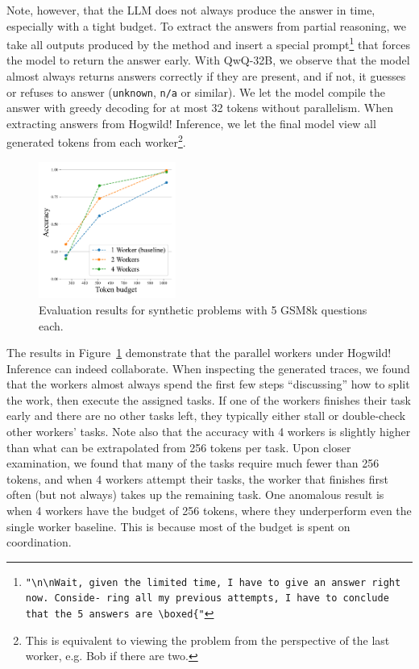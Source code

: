 Note, however, that the LLM does not always produce the answer in time, especially with a tight budget. To extract the answers from partial reasoning, we take all outputs produced by the method and insert a special prompt\footnote[9]{\texttt{"\textbackslash n\textbackslash nWait, given the limited time, I have to give an answer right now. Conside- ring all my previous attempts, I have to conclude that the 5 answers are \textbackslash boxed\{"}} that forces the model to return the answer early. With QwQ-32B, we observe that the model almost always returns answers correctly if they are present, and if not, it guesses or refuses to answer (\texttt{unknown}, \texttt{n/a} or similar). We let the model compile the answer with greedy decoding for at most 32 tokens without parallelism. When extracting answers from Hogwild! Inference, we let the final model view all generated tokens from each worker\footnote[10]{This is equivalent to viewing the problem from the perspective of the last worker, e.g. Bob if there are two.}.

\begin{figure}
  \vspace{-20px}
  \begin{center}
    \includegraphics[width=0.4\textwidth]{resources/method_comparison_gsm8k.pdf}
  \end{center}
  \vspace{-10px}
  \caption{Evaluation results for synthetic problems with 5 GSM8k questions each.}\vspace{-10px}
  \label{fig:results_gsm8k}

\end{figure}


The results in Figure~\ref{fig:results_gsm8k} demonstrate that the parallel workers under Hogwild! Inference can indeed collaborate. When inspecting the generated traces, we found that the workers almost always spend the first few steps ``discussing'' how to split the work, then execute the assigned tasks. If one of the workers finishes their task early and there are no other tasks left, they typically either stall or double-check other workers' tasks. Note also that the accuracy with 4 workers is slightly higher than what can be extrapolated from 256 tokens per task. Upon closer examination, we found that many of the tasks require much fewer than 256 tokens, and when 4 workers attempt their tasks, the worker that finishes first often (but not always) takes up the remaining task. One anomalous result is when 4 workers have the budget of 256 tokens, where they underperform even the single worker baseline. This is because most of the budget is spent on coordination.

